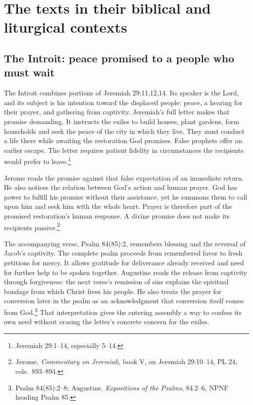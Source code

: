 \section{The texts in their biblical and liturgical contexts}

\subsection{The Introit: peace promised to a people who must wait}

The Introit combines portions of Jeremiah 29:11,12,14. Its speaker is the Lord, and its subject is his intention toward the displaced people: peace, a hearing for their prayer, and gathering from captivity. Jeremiah's full letter makes that promise demanding. It instructs the exiles to build houses, plant gardens, form households and seek the peace of the city in which they live. They must conduct a life there while awaiting the restoration God promises. False prophets offer an earlier escape. The letter requires patient fidelity in circumstances the recipients would prefer to leave.\footnote{Jeremiah 29:1--14, especially 5--14.}

Jerome reads the promise against that false expectation of an immediate return. He also notices the relation between God's action and human prayer. God has power to fulfill his promise without their assistance, yet he summons them to call upon him and seek him with the whole heart. Prayer is therefore part of the promised restoration's human response. A divine promise does not make its recipients passive.\footnote{Jerome, \textit{Commentary on Jeremiah}, book V, on Jeremiah 29:10--14, PL 24, cols.~893--894.}

The accompanying verse, Psalm 84(85):2, remembers blessing and the reversal of Jacob's captivity. The complete psalm proceeds from remembered favor to fresh petitions for mercy. It allows gratitude for deliverance already received and need for further help to be spoken together. Augustine reads the release from captivity through forgiveness: the next verse's remission of sins explains the spiritual bondage from which Christ frees his people. He also treats the prayer for conversion later in the psalm as an acknowledgment that conversion itself comes from God.\footnote{Psalm 84(85):2--8; Augustine, \textit{Expositions of the Psalms}, 84.2--6, NPNF heading Psalm 85.} That interpretation gives the entering assembly a way to confess its own need without erasing the letter's concrete concern for the exiles.

